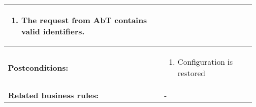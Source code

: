 \begin{tabularx}{\linewidth}{|l|X|}
\begin{enumerate}
							\item The request from AbT contains valid identifiers.
						\end{enumerate} \\
\hline
\textbf{Postconditions:} & 
  \begin{minipage}{\linewidth}
  \vspace{0.05em}
  \begin{enumerate}
    \item Configuration is restored
  \end{enumerate}
  \vspace{0.05em}
\end{minipage}
\\
\hline
\textbf{Related business rules:} & - \\
\hline
\end{tabularx}


